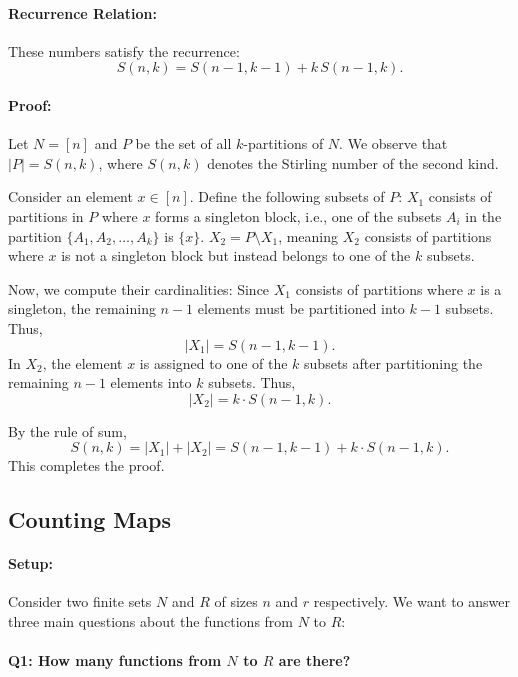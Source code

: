 \documentclass{article}
\begin{document}
\paragraph{Recurrence Relation:}  
These numbers satisfy the recurrence:
\[
S(n,k) = S(n-1,k-1) + k\, S(n-1,k).
\]
\paragraph{Proof:}  
Let \( N = [n] \) and \( P \) be the set of all \( k \)-partitions of \( N \). We observe that \( |P| = S(n, k) \), where \( S(n, k) \) denotes the Stirling number of the second kind.  

Consider an element \( x \in [n] \). Define the following subsets of \( P \):  
 \( X_1 \) consists of partitions in \( P \) where \( x \) forms a singleton block, i.e., one of the subsets \( A_i \) in the partition \( \{A_1, A_2, \dots, A_k\} \) is \( \{x\} \).  
 \( X_2 = P \setminus X_1 \), meaning \( X_2 \) consists of partitions where \( x \) is not a singleton block but instead belongs to one of the \( k \) subsets.  

Now, we compute their cardinalities:  
 Since \( X_1 \) consists of partitions where \( x \) is a singleton, the remaining \( n-1 \) elements must be partitioned into \( k-1 \) subsets. Thus,  
  \[
  |X_1| = S(n-1, k-1).
  \]  
 In \( X_2 \), the element \( x \) is assigned to one of the \( k \) subsets after partitioning the remaining \( n-1 \) elements into \( k \) subsets. Thus,  
  \[
  |X_2| = k \cdot S(n-1, k).
  \]  

By the rule of sum,  
\[
S(n, k) = |X_1| + |X_2| = S(n-1, k-1) + k \cdot S(n-1, k).
\]
This completes the proof.

\subsection{Counting Maps}

\paragraph{Setup:}
Consider two finite sets \(N\) and \(R\) of sizes \(n\) and \(r\) respectively. We want to answer three main questions about the functions from \(N\) to \(R\): 

\paragraph{Q1: How many functions from \(N\) to \(R\) are there?}
\end{document}
